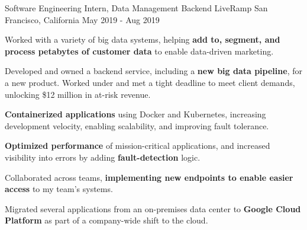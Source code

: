 

\begin{cventries}

    \cventry
      {Software Engineering Intern, Data Management Backend}
      {LiveRamp}
      {San Francisco, California}
      {May 2019 - Aug 2019}
      {
        \begin{cvitems}
          \item Worked with a variety of big data systems, helping \textbf{add to, segment, and process petabytes of customer data} to enable data-driven marketing.
          \item Developed and owned a backend service, including a \textbf{new big data pipeline}, for a new product. Worked under and met a tight deadline to meet client demands, unlocking \$12 million in at-risk revenue.
          \item \textbf{Containerized applications} using Docker and Kubernetes, increasing development velocity, enabling scalability, and improving fault tolerance.         
          \item \textbf{Optimized performance} of mission-critical applications, and increased visibility into errors by adding \textbf{fault-detection} logic.
          \item Collaborated across teams, \textbf{implementing new endpoints to enable easier access} to my team's systems.
          \item Migrated several applications from an on-premises data center to \textbf{Google Cloud Platform} as part of a company-wide shift to the cloud.
        \end{cvitems}
      }


\end{cventries}

